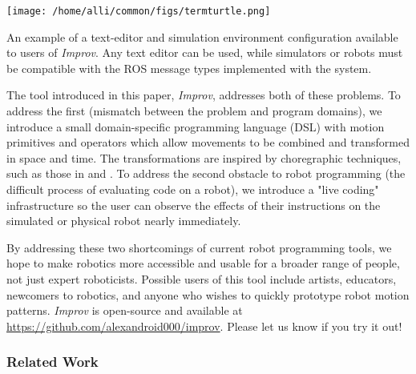 \documentclass[sigchi-a]{acmart}
\begin{document}
\begin{marginfigure}
    \texttt{[image: /home/alli/common/figs/termturtle.png]}
    \caption{An example of a text-editor and simulation environment
configuration available to users of \emph{Improv}. Any text editor can be
used, while simulators or robots must be compatible with the ROS message types
implemented with the system. \label{guiex}}
\end{marginfigure}



The tool introduced in this paper, \emph{Improv}, addresses both of these
problems. To address the first (mismatch between the problem and
program domains), we introduce a small domain-specific programming language
(DSL) with motion primitives and operators which allow
movements to be combined and transformed in space and time. The transformations
are inspired by choregraphic techniques, such as those in
\cite{laviers2017choreographic} \cite{cuykendall2014designing} \cite{alaoui2014choreography} and
\cite{humphrey1959art}.
To address the second obstacle to robot programming (the difficult
process of evaluating code on a robot), we introduce a "live coding"
infrastructure so the user can observe the effects of their instructions on the simulated or
physical robot nearly immediately.

By addressing these two shortcomings of current robot programming tools, we hope
to make robotics more accessible and usable for a broader range of people,
not just expert roboticists. Possible users of this tool include
artists, educators, newcomers to robotics, and anyone who wishes to quickly
prototype robot motion patterns. \emph{Improv} is open-source and available at
\url{https://github.com/alexandroid000/improv}. Please let us know if you try it
out!


\subsubsection*{Related Work}
\end{document}
